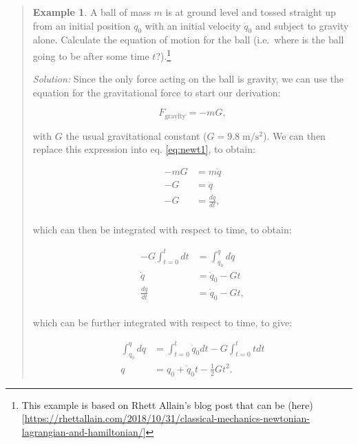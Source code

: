\documentclass[
  9pt,
]{extbook}
\theoremstyle{definition}
\theoremstyle{definition}
\newtheorem{example}{Example}[chapter]
\theoremstyle{definition}
\theoremstyle{remark}
\begin{document}
\begin{quote}
\begin{example}
\protect\hypertarget{exm:newtonianEx}{}{\label{exm:newtonianEx} }
A ball of mass \(m\) is at ground level and tossed straight up from an initial position \(q_0\) with an initial velocity \(\dot{q}_0\) and subject to gravity alone. Calculate the equation of motion for the ball (i.e.~where is the ball going to be after some time \(t\)?).\footnote{This example is based on Rhett Allain's blog post that can be (here){[}\url{https://rhettallain.com/2018/10/31/classical-mechanics-newtonian-lagrangian-and-hamiltonian/}{]}}

\emph{Solution:} Since the only force acting on the ball is gravity, we can use the equation for the gravitational force to start our derivation:

\begin{equation}
F_{\mathrm{gravity}}=-mG,
\end{equation}

with \(G\) the usual gravitational constant (\(G=9.8\; \mathrm{m}/\mathrm{s}^{2}\)). We can then replace this expression into eq. \eqref{eq:newt1}, to obtain:

\begin{equation}
\begin{aligned}
-mG &=m \ddot{q} \\
-G &=\ddot{q} \\
-G &=\frac{d\dot{q}}{dt}, \\
\end{aligned}
\end{equation}

which can then be integrated with respect to time, to obtain:

\begin{equation}
\begin{aligned}
-G\int_{t=0}^{t} dt &=\int_{\dot{q}_0}^{\dot{q}} d\dot{q}\\
\dot{q} &= \dot{q}_0-Gt\\
\frac{dq}{dt} &= \dot{q}_0-Gt,\\
\end{aligned}
\end{equation}

which can be further integrated with respect to time, to give:

\begin{equation}
\begin{aligned}
\int_{q_0}^{q} dq &= \int_{t=0}^{t} \dot{q}_0 dt -G \int_{t=0}^{t}tdt\\
q &= q_0 + \dot{q}_0 t -\frac{1}{2}Gt^2.
\end{aligned}
\end{equation}


\end{example}
\end{quote}
\end{document}
